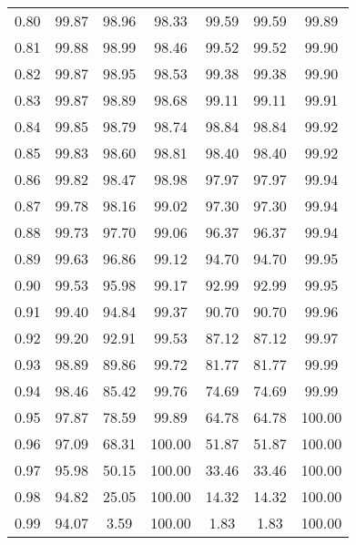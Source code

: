 \begin{tabular}{|c|c|c|c|c|c|c|}
      0.80 &     99.87 &     98.96 &      98.33 &   99.59 &      99.59 &         99.89 \\
      0.81 &     99.88 &     98.99 &      98.46 &   99.52 &      99.52 &         99.90 \\
      0.82 &     99.87 &     98.95 &      98.53 &   99.38 &      99.38 &         99.90 \\
      0.83 &     99.87 &     98.89 &      98.68 &   99.11 &      99.11 &         99.91 \\
      0.84 &     99.85 &     98.79 &      98.74 &   98.84 &      98.84 &         99.92 \\
      0.85 &     99.83 &     98.60 &      98.81 &   98.40 &      98.40 &         99.92 \\
      0.86 &     99.82 &     98.47 &      98.98 &   97.97 &      97.97 &         99.94 \\
      0.87 &     99.78 &     98.16 &      99.02 &   97.30 &      97.30 &         99.94 \\
      0.88 &     99.73 &     97.70 &      99.06 &   96.37 &      96.37 &         99.94 \\
      0.89 &     99.63 &     96.86 &      99.12 &   94.70 &      94.70 &         99.95 \\
      0.90 &     99.53 &     95.98 &      99.17 &   92.99 &      92.99 &         99.95 \\
      0.91 &     99.40 &     94.84 &      99.37 &   90.70 &      90.70 &         99.96 \\
      0.92 &     99.20 &     92.91 &      99.53 &   87.12 &      87.12 &         99.97 \\
      0.93 &     98.89 &     89.86 &      99.72 &   81.77 &      81.77 &         99.99 \\
      0.94 &     98.46 &     85.42 &      99.76 &   74.69 &      74.69 &         99.99 \\
      0.95 &     97.87 &     78.59 &      99.89 &   64.78 &      64.78 &        100.00 \\
      0.96 &     97.09 &     68.31 &     100.00 &   51.87 &      51.87 &        100.00 \\
      0.97 &     95.98 &     50.15 &     100.00 &   33.46 &      33.46 &        100.00 \\
      0.98 &     94.82 &     25.05 &     100.00 &   14.32 &      14.32 &        100.00 \\
      0.99 &     94.07 &      3.59 &     100.00 &    1.83 &       1.83 &        100.00 \\
\bottomrule
\end{tabular}
